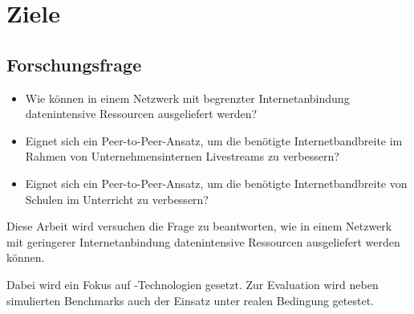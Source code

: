 \section{Ziele}
\subsection{Forschungsfrage}
\begin{itemize}
	\item Wie können in einem Netzwerk mit begrenzter Internetanbindung datenintensive Ressourcen ausgeliefert werden?
	\item Eignet sich ein Peer-to-Peer-Ansatz, um die benötigte Internetbandbreite im Rahmen von Unternehmensinternen Livestreams zu verbessern?
	\item Eignet sich ein Peer-to-Peer-Ansatz, um die benötigte Internetbandbreite von Schulen im Unterricht zu verbessern?
\end{itemize}
Diese Arbeit wird versuchen die Frage zu beantworten, wie in einem Netzwerk mit geringerer Internetanbindung datenintensive Ressourcen ausgeliefert werden können.

Dabei wird ein Fokus auf \pTp-Technologien gesetzt. Zur Evaluation wird neben simulierten Benchmarks auch der Einsatz unter realen Bedingung getestet.  

